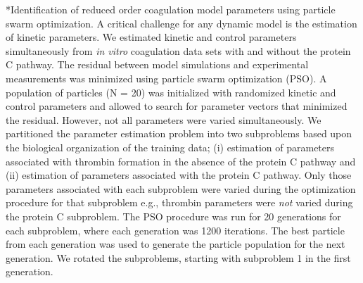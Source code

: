 \documentclass[12pt]{article}
\makeatletter
\renewcommand\subsection{\@startsection
	{subsection}{2}{0mm}
	{-0.05in}
	{-0.5\baselineskip}
	{\normalfont\normalsize\bfseries}}
\makeatother
\begin{document}
\subsection*{Identification of reduced order coagulation model parameters using particle swarm optimization.}
A critical challenge for any dynamic model is the estimation of kinetic parameters. 
We estimated kinetic and control parameters simultaneously from \emph{in vitro} coagulation data sets with and without the protein C pathway. 
The residual between model simulations and experimental measurements was minimized using particle swarm optimization (PSO). 
A population of particles (N = 20) was initialized with randomized kinetic and control parameters and allowed to search for parameter vectors that minimized
the residual. However, not all parameters were varied simultaneously. 
We partitioned the parameter estimation problem into two subproblems based upon the biological organization of the training data; 
(i) estimation of parameters associated with thrombin formation in the absence of the protein C pathway and (ii) estimation of parameters associated with the protein C pathway.
Only those parameters associated with each subproblem were varied during the optimization procedure for that subproblem e.g., thrombin parameters were \textit{not} varied during the protein C subproblem.
The PSO procedure was run for 20 generations for each subproblem, where each generation was 1200 iterations. The best particle from each generation was used to generate the particle population
for the next generation. We rotated the subproblems, starting with subproblem 1 in the first generation.
\end{document}
